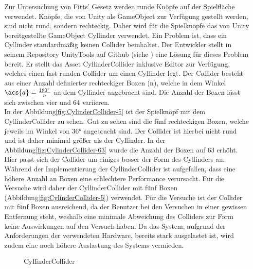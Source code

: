 Zur Untersuchung von Fitts' Gesetz werden runde Knöpfe auf der Spielfläche verwendet. Knöpfe, die von Unity als GameObject zur Verfügung gestellt werden, sind nicht rund, sondern rechteckig. Daher wird für die Spielknöpfe das von Unity bereitgestellte GameObject {\ttfamily Cyllinder} verwendet. Ein Problem ist, dass ein Cyllinder standardmäßig keinen Collider beinhaltet. Der Entwickler \citeauthor{kode80.2016} stellt in seinem Repository UnityTools auf Github (siehe \cite{kode80.2016}) eine Lösung für dieses Problem bereit. Er stellt das Asset {\ttfamily CyllinderCollider} inklusive Editor zur Verfügung, welches einen fast runden Collider um einen Cyllinder legt. Der Collider besteht aus einer Anzahl definierter rechteckiger Boxen (n), welche in dem Winkel $\acs{a} = \frac{180^\circ}{n}$ an dem Cyllinder angebracht sind. Die Anzahl der Boxen lässt sich zwischen vier und 64 variieren.\\
In der Abbildung\autoref{fig:CylinderCollider-5} ist der Spielknopf mit dem CyllinderCollider zu sehen. Gut zu sehen sind die fünf rechteckigen Boxen, welche jeweils im Winkel von 36° angebracht sind. Der Collider ist hierbei nicht rund und ist daher minimal größer als der Cyllinder. In der Abbildung\autoref{fig:CylinderCollider-63} wurde die Anzahl der Boxen auf 63 erhöht. Hier passt sich der Collider um einiges besser der Form des Cyllinders an. Während der Implementierung der CyllinderCollider ist aufgefallen, dass eine höhere Anzahl an Boxen eine schlechtere Performance verursacht. Für die Versuche wird daher der CyllinderCollider mit fünf Boxen (Abbildung\autoref{fig:CylinderCollider-5}) verwendet. Für die Versuche ist der Collider mit fünf Boxen ausreichend, da der Benutzer bei den Versuchen in einer gewissen Entfernung steht, weshalb eine minimale Abweichung des Colliders zur Form keine Auswirkungen auf den Versuch haben. Da das System, aufgrund der Anforderungen der verwendeten Hardware, bereits stark ausgelastet ist, wird zudem eine noch höhere Auslastung des Systems vermieden.

\begin{figure}[!htbp]
	\centering
	\qquad      
	\caption{CyllinderCollider}
	\label{fig:CylinderCollider}
\end{figure}  

